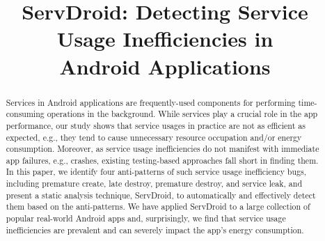 \documentclass[sigconf,review, anonymous]{acmart}
\begin{document}
\title{ServDroid: Detecting Service Usage Inefficiencies in\\  Android Applications}

\begin{abstract}
Services in Android applications are frequently-used components for performing
time-consuming operations in the background. While services play a crucial role
in the app performance, our study shows that service usages in practice are not
as efficient as expected, e.g., they tend to cause unnecessary resource occupation
and/or energy consumption.
Moreover, as service usage inefficiencies do not manifest
with immediate app failures, e.g., crashes, existing testing-based approaches
fall short in finding them.
In this paper, we identify four anti-patterns of such service usage
inefficiency bugs, including premature create, late destroy, premature destroy,
and service leak, and present a static analysis technique, \textsf{ServDroid},
to automatically and effectively detect them based on the anti-patterns.
We have applied \textsf{ServDroid} to a large collection of popular real-world
Android apps and, surprisingly, we find that service usage inefficiencies are
prevalent and can severely impact the app's energy consumption.
\end{abstract}
\end{document}
